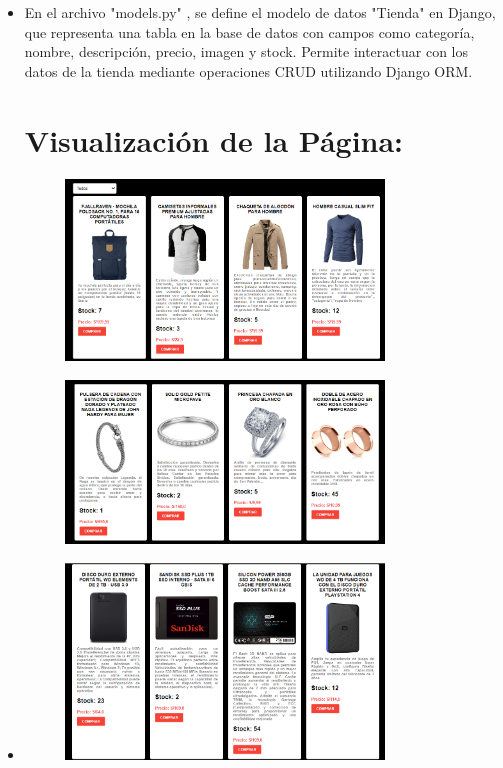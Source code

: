 \documentclass{article}
\begin{document}
  \begin{itemize}
		\item    En el archivo "models.py" , se define el modelo de datos "Tienda" en Django, que representa una tabla en la base de datos con campos como categoría, nombre, descripción, precio, imagen y stock. Permite interactuar con los datos de la tienda mediante operaciones CRUD utilizando Django ORM.

\section{Visualización de la Página:}
	\begin{figure}[H]
		\centering
		\includegraphics[width=0.8\textwidth,keepaspectratio]{Latex/img/todo.png}
	\end{figure}
\begin{figure}[H]
		\centering
		\includegraphics[width=0.8\textwidth,keepaspectratio]{Latex/img/todo2.png}
	\end{figure}
 \item  \begin{figure}[H]
		\centering
		\includegraphics[width=0.8\textwidth,keepaspectratio]{Latex/img/todo3.png}

\end{figure}
\end{itemize}
\end{document}
